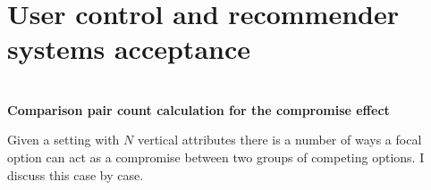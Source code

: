 \documentclass[a4paper,12pt]{article}
\begin{document}
    









































































\newpage
\section{User control and recommender systems acceptance}\label{chapter:UserControlAndRS}


%




\clearpage

\appendix
\section{}\label{appendix:compromiseCalculation}

\textbf{Comparison pair count calculation for the compromise effect}

Given a setting with $N$ vertical attributes there is a number of ways a focal option can act as a compromise between two groups of competing options.
I discuss this case by case.
\end{document}
